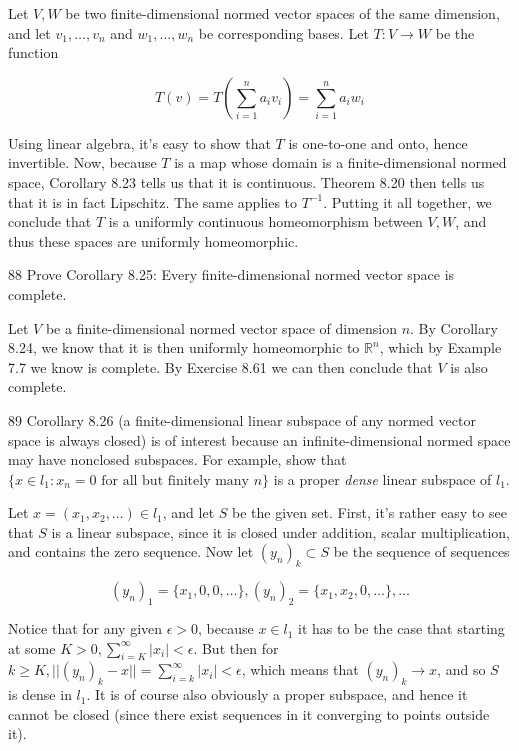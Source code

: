\begin{solution}
    
    Let $V, W$ be two finite-dimensional normed vector spaces of the same dimension, and let $v_1, \ldots, v_n$ and $w_1, \ldots, w_n$ be corresponding bases.
    Let $T: V \rightarrow W$ be the function 
    
    \[T(v) = T(\sum_{i=1}^{n} a_i v_i) = \sum_{i=1}^{n} a_i w_i\]

    Using linear algebra, it's easy to show that $T$ is one-to-one and onto, hence invertible.
    Now, because $T$ is a map whose domain is a finite-dimensional normed space, Corollary 8.23 tells us that it is continuous.
    Theorem 8.20 then tells us that it is in fact Lipschitz.
    The same applies to $T^{-1}$.
    Putting it all together, we conclude that $T$ is a uniformly continuous homeomorphism between $V, W$, and thus these spaces are uniformly homeomorphic.
\end{solution}

\begin{exercise}{88}
    Prove Corollary 8.25: Every finite-dimensional normed vector space is complete.
\end{exercise}

\begin{solution}
    
    Let $V$ be a finite-dimensional normed vector space of dimension $n$.
    By Corollary 8.24, we know that it is then uniformly homeomorphic to $\mathbb{R}^n$, which by Example 7.7 we know is complete.
    By Exercise 8.61 we can then conclude that $V$ is also complete.
\end{solution}

\begin{exercise}{89}
    Corollary 8.26 (a finite-dimensional linear subspace of any normed vector space is always closed) is of interest because an infinite-dimensional normed space may have nonclosed subspaces.
    For example, show that $\{x \in l_1: x_n = 0 \text{ for all but finitely many } n\}$ is a proper \textit{dense} linear subspace of $l_1$.
\end{exercise}

\begin{solution}
    
    Let $x = (x_1, x_2, \ldots) \in l_1$, and let $S$ be the given set.
    First, it's rather easy to see that $S$ is a linear subspace, since it is closed under addition, scalar multiplication, and contains the zero sequence.
    Now let $(y_n)_k \subset S$ be the sequence of sequences 

    \[(y_n)_1 = \{x_1, 0, 0, \ldots\}, (y_n)_2 = \{x_1, x_2, 0, \ldots\}, \ldots\]

    Notice that for any given $\epsilon > 0$, because $x \in l_1$ it has to be the case that starting at some $K > 0, \sum_{i=K}^{\infty} \lvert x_i \rvert < \epsilon$.
    But then for $k \geq K, \lvert \lvert (y_n)_k - x \rvert \rvert = \sum_{i=k}^{\infty} \lvert x_i \rvert < \epsilon$, which means that $(y_n)_k \rightarrow x$, and so $S$ is dense in $l_1$.
    It is of course also obviously a proper subspace, and hence it cannot be closed (since there exist sequences in it converging to points outside it).
\end{solution}